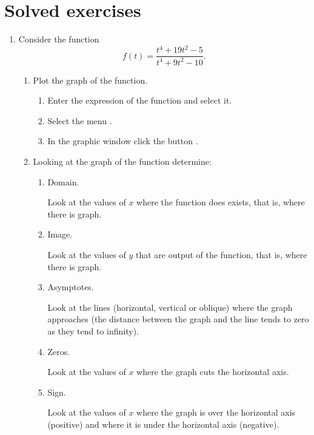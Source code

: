 \section{Solved exercises}

\begin{enumerate}[leftmargin=*]
\item Consider the function
\[
f(t)=\frac{t^4+19t^2-5}{t^4+9t^2-10}.
\]
 
\begin{enumerate}
\item Plot the graph of the function. 
\begin{indication}
\begin{enumerate}
\item Enter the expression of the function and select it. 
\item Select the menu .
\item In the graphic window click the button .
\end{enumerate}
\end{indication}

\item Looking at the graph of the function determine:
\begin{enumerate}
\item Domain.
\begin{indication}
Look at the values of $x$ where the function does exists, that is, where there is graph.
\end{indication}

\item  Image.
\begin{indication}
Look at the values of $y$ that are output of the function, that is, where there is graph. 
\end{indication}

\item  Asymptotes.
\begin{indication}
Look at the lines (horizontal, vertical or oblique) where the graph approaches (the distance between the graph and the line tends to zero as they tend to infinity).
\end{indication}

\item  Zeros.
\begin{indication}
Look at the values of $x$  where the graph cuts the horizontal axis. 
\end{indication}

\item Sign.
\begin{indication}
Look at the values of $x$ where the graph is over the horizontal axis (positive) and where it is under the horizontal axis (negative).
\end{indication}


\end{enumerate}
\end{enumerate}
\end{enumerate}
